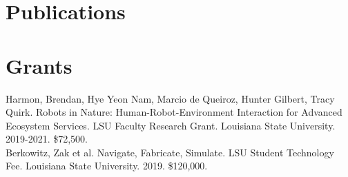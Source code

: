 \documentclass[]{baharmon_cv}
\begin{document}
\section{Publications} 
\begin{refsection}
\nocite{*}
\setlength\bibitemsep{0.75em}
\sectiondivider \linebreak

\printbibliography[title={Books\vspace{0.2em}},type=book, heading=subbibliography]
\sectiondivider \linebreak

\printbibliography[title={Papers
\vspace{0.2em}},keyword=peer_reviewed, heading=subbibliography]
\sectiondivider \linebreak

\printbibliography[title={Book chapters\vspace{0.2em}},type=incollection, heading=subbibliography]
\sectiondivider \linebreak

\printbibliography[title={Select presentations\vspace{0.2em}},type=unpublished, heading=subbibliography]
\sectiondivider \linebreak

\printbibliography[title={Reports\vspace{0.2em}},type=report, heading=subbibliography]
\sectiondivider \linebreak

\end{refsection}

\clearpage


\section{Grants} 

Harmon, Brendan, Hye Yeon Nam, Marcio de Queiroz, Hunter Gilbert, Tracy Quirk. Robots in Nature: Human-Robot-Environment Interaction for Advanced Ecosystem Services. LSU Faculty Research Grant. Louisiana State University. 2019-2021. \$72,500.\\

Berkowitz, Zak et al. Navigate, Fabricate, Simulate. LSU Student Technology Fee. Louisiana State University. 2019.	\$120,000.\\
\end{document}
